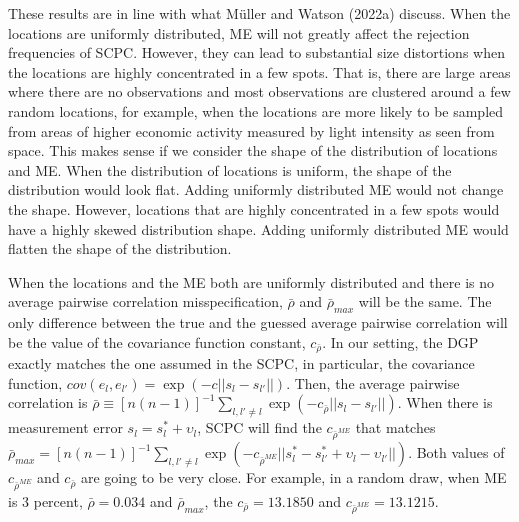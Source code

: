 \documentclass[
]{article}
\begin{document}
These results are in line with what Müller and Watson (2022a) discuss.
When the locations are uniformly distributed, ME will not greatly affect
the rejection frequencies of SCPC. However, they can lead to substantial
size distortions when the locations are highly concentrated in a few
spots. That is, there are large areas where there are no observations
and most observations are clustered around a few random locations, for
example, when the locations are more likely to be sampled from areas of
higher economic activity measured by light intensity as seen from space.
This makes sense if we consider the shape of the distribution of
locations and ME. When the distribution of locations is uniform, the
shape of the distribution would look flat. Adding uniformly distributed
ME would not change the shape. However, locations that are highly
concentrated in a few spots would have a highly skewed distribution
shape. Adding uniformly distributed ME would flatten the shape of the
distribution.

When the locations and the ME both are uniformly distributed and there
is no average pairwise correlation misspecification, \(\bar\rho\) and
\(\bar\rho_{max}\) will be the same. The only difference between the
true and the guessed average pairwise correlation will be the value of
the covariance function constant, \(c_{\bar\rho}\). In our setting, the
DGP exactly matches the one assumed in the SCPC, in particular, the
covariance function, \(cov(e_l,e_{l'})=\exp(-c||s_l-s_{l'}||)\). Then,
the average pairwise correlation is
\(\bar{\rho}\equiv[n(n-1)]^{-1}\sum_{l,l'\not=l}\exp(-c_{\bar{\rho}}||s_l-s_{l'}||)\).
When there is measurement error \(s_l=s_l^*+\upsilon_l\), SCPC will find
the \(c_{\bar\rho^{ME}}\) that matches
\(\bar{\rho}_{max}=[n(n-1)]^{-1}\sum_{l,l'\not=l}\exp(-c_{\bar{\rho}^{ME}}||s_l^*-s^*_{l'}+\upsilon_l-\upsilon_{l'}||)\).
Both values of \(c_{\bar\rho^{ME}}\) and \(c_{\bar\rho}\) are going to
be very close. For example, in a random draw, when ME is 3 percent,
\(\bar\rho=0.034\) and \(\bar\rho_{max}\), the \(c_{\bar\rho}=13.1850\)
and \(c_{\bar\rho^{ME}}=13.1215\).
\end{document}
